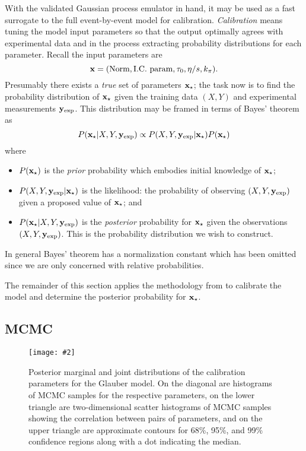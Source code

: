 \documentclass[aps,prc,reprint,superscriptaddress,amsmath]{revtex4-1}
\newcommand{\widefig}[3][t]{
  \begin{figure*}[#1]
    \texttt{[image: \#2]}
    \caption{\label{fig:#2}#3}
  \end{figure*}
}
\begin{document}
With the validated Gaussian process emulator in hand, it may be used as a fast surrogate to the full event-by-event model for calibration.
\emph{Calibration} means tuning the model input parameters so that the output optimally agrees with experimental data and in the process extracting probability distributions for each parameter.
Recall the input parameters are
\begin{equation*}
  \mathbf x = (\text{Norm}, \text{I.C.\ param}, \tau_0, \eta/s, k_\pi).
\end{equation*}
Presumably there exists a \emph{true} set of parameters $\mathbf x_\star$; the task now is to find the probability distribution of $\mathbf x_\star$ given the training data $(X, Y)$ and experimental measurements $\mathbf y_\text{exp}$.
This distribution may be framed in terms of Bayes' theorem as
\begin{equation}
  P(\mathbf x_\star|X,Y,\mathbf y_\text{exp}) \propto P(X,Y,\mathbf y_\text{exp}|\mathbf x_\star) P(\mathbf x_\star)
\end{equation}
where
\begin{itemize}
  \item $P(\mathbf x_\star)$ is the \emph{prior} probability which embodies initial knowledge of $\mathbf x_\star$;
  \item $P(X,Y,\mathbf y_\text{exp}|\mathbf x_\star)$ is the likelihood:
    the probability of observing $(X, Y, \mathbf y_\text{exp})$ given a proposed value of $\mathbf x_\star$; and
  \item $P(\mathbf x_\star|X,Y,\mathbf y_\text{exp})$ is the \emph{posterior} probability for $\mathbf x_\star$ given the observations $(X, Y, \mathbf y_\text{exp})$.
    This is the probability distribution we wish to construct.
\end{itemize}
In general Bayes' theorem has a normalization constant which has been omitted since we are only concerned with relative probabilities.

The remainder of this section applies the methodology from \cite{OHagan:2006ba,Higdon:2008cmc,Higdon:2014tva} to calibrate the model and determine the posterior probability for $\mathbf x_\star$.

\subsection{MCMC}

\widefig{cal_post_glb}{
  Posterior marginal and joint distributions of the calibration parameters for the Glauber model.
  On the diagonal are histograms of MCMC samples for the respective parameters,
  on the lower triangle are two-dimensional scatter histograms of MCMC samples showing the correlation between pairs of parameters,
  and on the upper triangle are approximate contours for 68\%, 95\%, and 99\% confidence regions along with a dot indicating the median.
}
\end{document}
